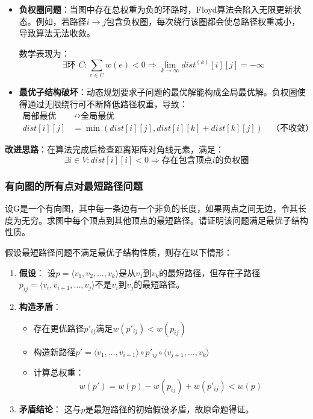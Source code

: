 \documentclass[./../main.tex]{subfiles}
\begin{document}
\begin{itemize}
    \item \textbf{负权圈问题}：当图中存在总权重为负的环路时，Floyd算法会陷入无限更新状态。例如，若路径$i \rightarrow j$包含负权圈，每次绕行该圈都会使总路径权重减小，导致算法无法收敛。
    
    数学表现为：
    $$
    \exists \text{环 } C: \sum_{e \in C} w(e) < 0 \Rightarrow \lim_{k \to \infty} dist^{(k)}[i][j] = -\infty
    $$
    
    \item \textbf{最优子结构破坏}：动态规划要求子问题的最优解能构成全局最优解。负权圈使得通过无限绕行可不断降低路径权重，导致：
    \begin{align*}
        \text{局部最优} &\nrightarrow \text{全局最优} \\
        dist[i][j] &= \min(dist[i][j], dist[i][k] + dist[k][j]) \quad \text{（不收敛）}
    \end{align*}
\end{itemize}

\textbf{改进思路}：在算法完成后检查距离矩阵对角线元素，满足：
$$
\exists i \in V: dist[i][i] < 0 \Rightarrow \text{存在包含顶点$i$的负权圈}
$$

\subsubsection{有向图的所有点对最短路径问题}
设G是一个有向图，其中每一条边有一个非负的长度，如果两点之间无边，令其长度为无穷。求图中每个顶点到其他顶点的最短路径。请证明该问题满足最优子结构性质。

假设最短路径问题不满足最优子结构性质，则存在以下情形：

\begin{enumerate}
    \item \textbf{假设}：
    设$p = \langle v_{1},v_{2},\ldots,v_{k} \rangle$是从$v_{1}$到$v_{k}$的最短路径，但存在子路径$p_{ij} = \langle v_{i},v_{i+1},\ldots,v_{j} \rangle$不是$v_{i}$到$v_{j}$的最短路径。
    
    \item \textbf{构造矛盾}：
    \begin{itemize}
        \item 存在更优路径$p'_{ij}$满足$w(p'_{ij}) < w(p_{ij})$
        \item 构造新路径$p' = \langle v_{1},\ldots,v_{i-1} \rangle \circ p'_{ij} \circ \langle v_{j+1},\ldots,v_{k} \rangle$
        \item 计算总权重：
        $$
        w(p') = w(p) - w(p_{ij}) + w(p'_{ij}) < w(p)
        $$
    \end{itemize}
    
    \item \textbf{矛盾结论}：
    这与$p$是最短路径的初始假设矛盾，故原命题得证。
\end{enumerate}
\end{document}
